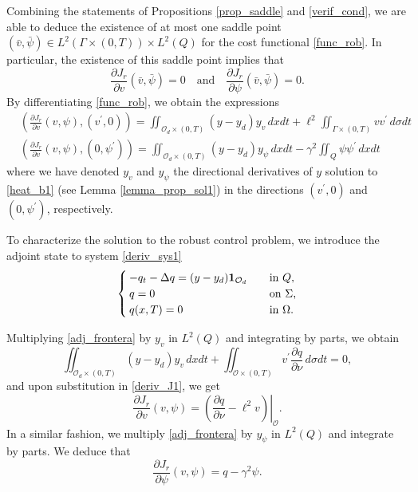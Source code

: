 \documentclass[preprint,10pt]{article}
\numberwithin{equation}{section}
\numberwithin{theorem}{section}
\begin{document}
{Combining the statements of Propositions \ref{prop_saddle} and \ref{verif_cond}, we are able to deduce the existence of at most one saddle point $(\bar v,\bar \psi)\in L^2(\Gamma\times(0,T))\times L^2(Q)$ for the cost functional \eqref{func_rob}. In particular, the existence of this saddle point implies that 
%
\begin{equation}
\frac{\partial J_r}{\partial v}(\bar v,\bar \psi)=0 \quad \text{and}\quad \frac{\partial J_r}{\partial \psi}(\bar v,\bar \psi)=0.
\end{equation}
%
By differentiating \eqref{func_rob}, we obtain the expressions 
%
\begin{align}\label{deriv_J1}
&\left(\frac{\partial J_r}{\partial v}(v,\psi),(v^\prime,0)\right)=\iint_{\mathcal O_d\times(0,T)}(y-y_d)y_v\,dxdt+\ell^2\iint_{\Gamma\times(0,T)}vv^\prime\,d\sigma dt \\
&\left(\frac{\partial J_r}{\partial v}(v,\psi),(0,\psi^\prime)\right)=\iint_{\mathcal O_d\times(0,T)}(y-y_d)y_\psi\,dxdt-\gamma^2\iint_{Q}\psi\psi^\prime\,dxdt
\end{align}
%
where we have denoted $y_v$ and $y_\psi$ the directional derivatives of $y$ solution to \eqref{heat_b1} (see Lemma \ref{lemma_prop_sol1}) in the directions $(v^\prime,0)$ and $(0,\psi^\prime)$, respectively. 

To characterize the solution to the robust control problem, we introduce the adjoint state to system \eqref{deriv_sys1}
%
\begin{equation}\label{adj_frontera}
\begin{cases}
-q_t-\Delta q=(y-y_d)\mathbf{1}_{\mathcal O_d} \quad& \text{in }Q, \\
q=0 \quad &\textnormal{on $\Sigma$,} \\
q(x,T)=0 \quad &\textnormal{in $\Omega$}.
\end{cases}
\end{equation}

Multiplying \eqref{adj_frontera} by $y_v$ in $L^2(Q)$ and integrating by parts, we obtain 
%
\begin{equation*}
\iint_{\mathcal O_d\times(0,T)}(y-y_d)y_v\,dxdt+\iint_{\mathcal O\times(0,T)}v^\prime\frac{\partial q}{\partial \nu}\,d\sigma dt=0,
\end{equation*}
%
and upon substitution in \eqref{deriv_J1}, we get 
%
\begin{equation}
\frac{\partial J_r}{\partial v}(v,\psi)=\left.\left(\frac{\partial q}{\partial \nu}-\ell^2v\right)\right|_{\mathcal O}. 
\end{equation}
%
In a similar fashion, we multiply \eqref{adj_frontera} by $y_\psi$ in $L^2(Q)$ and integrate by parts. We deduce that 
%
\begin{equation}
\frac{\partial J_r}{\partial \psi}(v,\psi)=q-\gamma^2\psi. 
\end{equation}

}
\end{document}
